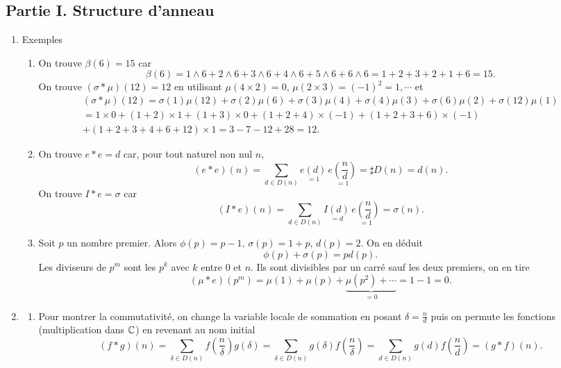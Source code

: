 \subsection*{Partie I. Structure d'anneau}
\begin{enumerate}
 \item Exemples
\begin{enumerate}
 \item On trouve $\beta(6) = 15$ car 
\begin{displaymath}
 \beta(6) = 1\wedge 6 + 2\wedge 6 + 3\wedge 6 + 4\wedge 6 + 5\wedge 6 + 6\wedge 6 
= 1 + 2 + 3 + 2 + 1 + 6 = 15.
\end{displaymath}
On trouve $(\sigma*\mu)(12) = 12$ en utilisant $\mu(4\times 2)=0$, $\mu(2\times 3)=(-1)^2=1, \cdots$ et
\begin{multline*}
 (\sigma*\mu)(12) = \sigma(1)\mu(12) + \sigma(2)\mu(6) + \sigma(3)\mu(4) + \sigma(4)\mu(3) + \sigma(6)\mu(2) + \sigma(12)\mu(1)\\ 
=  1\times 0 + (1+2)\times 1 + (1+3)\times 0 + (1+2+4)\times (-1) + (1+2+3+6)\times (-1) \\ + (1+2+3+4+6+12)\times 1 
= 3 -7 -12 + 28 = 12.
\end{multline*}

 \item On trouve $e*e=d$ car, pour tout naturel non nul $n$,
\begin{displaymath}
 (e*e)(n) = \sum_{d\in D(n)}\underset{=1}{e(d)}\,\underset{=1}{e(\frac{n}{d})} = \sharp D(n) = d(n).
\end{displaymath}
On trouve $I*e = \sigma$ car
\begin{displaymath}
 (I*e)(n) = \sum_{d\in D(n)}\underset{=d}{I(d)}\,\underset{=1}{e(\frac{n}{d})} = \sigma(n).
\end{displaymath}
\item Soit $p$ un nombre premier. Alors $\phi(p) = p-1$, $\sigma(p)= 1 + p$, $d(p)=2$. On en déduit 
\begin{displaymath}
 \phi(p) + \sigma(p) = pd(p).
\end{displaymath}
Les diviseurs de $p^m$ sont les $p^k$ avec $k$ entre $0$ et $n$. Ils sont divisibles par un carré sauf les deux premiers, on en tire
\begin{displaymath}
  (\mu*e)(p^m) = \mu(1) + \mu(p) + \underset{=0}{\underbrace{\mu(p^2) + \cdots }} = 1 - 1 = 0.
\end{displaymath}
\end{enumerate}

\item
\begin{enumerate}
 \item Pour montrer la commutativité, on change la variable locale de sommation en posant $\delta = \frac{n}{d}$ puis on permute les fonctions (multiplication dans $\mathbb{C}$) en revenant au nom initial
\begin{displaymath}
 (f*g)(n) = \sum_{\delta \in D(n)}f(\frac{n}{\delta})g(\delta)
 = \sum_{\delta \in D(n)}g(\delta)f(\frac{n}{\delta})
 = \sum_{d \in D(n)}g(d)f(\frac{n}{d}) = (g*f)(n).
\end{displaymath}


\end{enumerate}
\end{enumerate}
